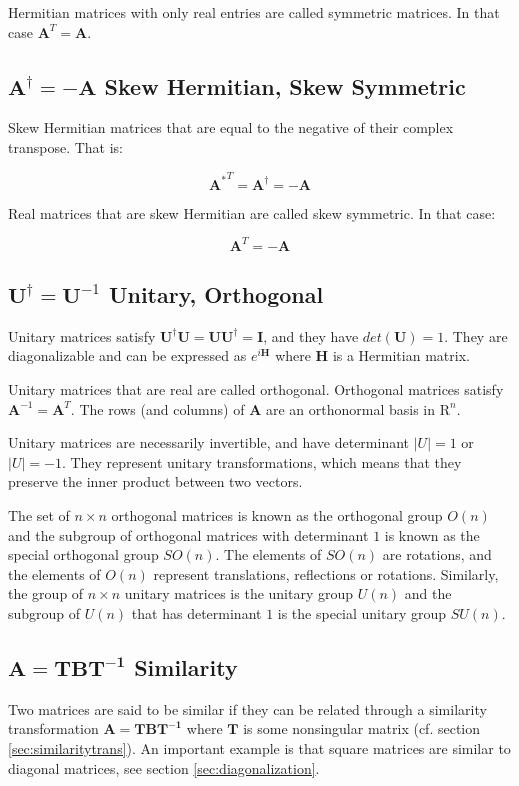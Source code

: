 Hermitian matrices with only real entries are called symmetric matrices. In that case $\mathbf{A}^T = \mathbf{A}$.


\subsection{$\mathbf{A}^{\dagger} = -\mathbf{A}$ Skew Hermitian, Skew Symmetric}
Skew Hermitian matrices that are equal to the negative of their complex transpose. That is:

\begin{equation}
{\mathbf{A}^{*}}^T = \mathbf{A}^\dagger = -\mathbf{A} 
\end{equation}

Real matrices that are skew Hermitian are called skew symmetric. In that case:

\begin{equation}
\mathbf{A}^T = -\mathbf{A} 
\end{equation}


\subsection{$\mathbf{U}^{\dagger} = \mathbf{U}^{-1}$ Unitary, Orthogonal}
Unitary matrices satisfy $\mathbf{U}^{\dagger}\mathbf{U} = \mathbf{UU}^{\dagger}=\mathbf{I}$, and they have $det(\mathbf{U}) = 1$. They are diagonalizable and can be expressed as $e^{i\mathbf{H}}$ where $\mathbf{H}$ is a Hermitian matrix.

Unitary matrices that are real are called orthogonal.  Orthogonal matrices satisfy $\mathbf{A}^{-1} = \mathbf{A}^T$. The rows (and columns) of $\mathbf{A}$ are an orthonormal basis in $\mathrm{R}^n$.

Unitary matrices are necessarily invertible, and have determinant $|U|=1$ or $|U|=-1$. They represent unitary transformations, which means that they preserve the inner product between two vectors.

The set of $n \times n$ orthogonal matrices is known as the orthogonal group $O(n)$ and the subgroup of orthogonal matrices with determinant $1$ is known as the special orthogonal group $SO(n)$. The elements of $SO(n)$ are rotations, and the elements of $O(n)$ represent translations, reflections or rotations. Similarly, the group of $n \times n$ unitary matrices is the unitary group $U(n)$ and the subgroup of $U(n)$ that has determinant $1$ is the special unitary group $SU(n)$.

\subsection{$\mathbf{A} = \mathbf{TBT^{-1}}$ Similarity}
Two matrices are said to be similar if they can be related through a similarity transformation  $\mathbf{A} = \mathbf{TBT^{-1}}$ where $\mathbf{T}$ is some nonsingular matrix (cf. section \ref{sec:similaritytrans}). An important example is that square matrices are similar to diagonal matrices, see section \ref{sec:diagonalization}. 
   


